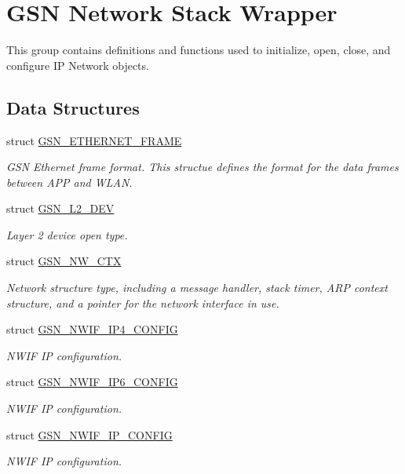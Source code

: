 \hypertarget{a00670}{
\section{GSN Network Stack Wrapper}
\label{a00670}
}


This group contains definitions and functions used to initialize, open, close, and configure IP Network objects.  


\subsection*{Data Structures}
\begin{DoxyCompactItemize}
\item 
struct \hyperlink{a00068}{GSN\_\-ETHERNET\_\-FRAME}
\begin{DoxyCompactList}\small\item\em GSN Ethernet frame format. This structue defines the format for the data frames between APP and WLAN. \end{DoxyCompactList}\item 
struct \hyperlink{a00107}{GSN\_\-L2\_\-DEV}
\begin{DoxyCompactList}\small\item\em Layer 2 device open type. \end{DoxyCompactList}\item 
struct \hyperlink{a00164}{GSN\_\-NW\_\-CTX}
\begin{DoxyCompactList}\small\item\em Network structure type, including a message handler, stack timer, ARP context structure, and a pointer for the network interface in use. \end{DoxyCompactList}\item 
struct \hyperlink{a00170}{GSN\_\-NWIF\_\-IP4\_\-CONFIG}
\begin{DoxyCompactList}\small\item\em NWIF IP configuration. \end{DoxyCompactList}\item 
struct \hyperlink{a00171}{GSN\_\-NWIF\_\-IP6\_\-CONFIG}
\begin{DoxyCompactList}\small\item\em NWIF IP configuration. \end{DoxyCompactList}\item 
struct \hyperlink{a00172}{GSN\_\-NWIF\_\-IP\_\-CONFIG}
\begin{DoxyCompactList}\small\item\em NWIF IP configuration. \end{DoxyCompactList}\item 

\end{DoxyCompactItemize}
